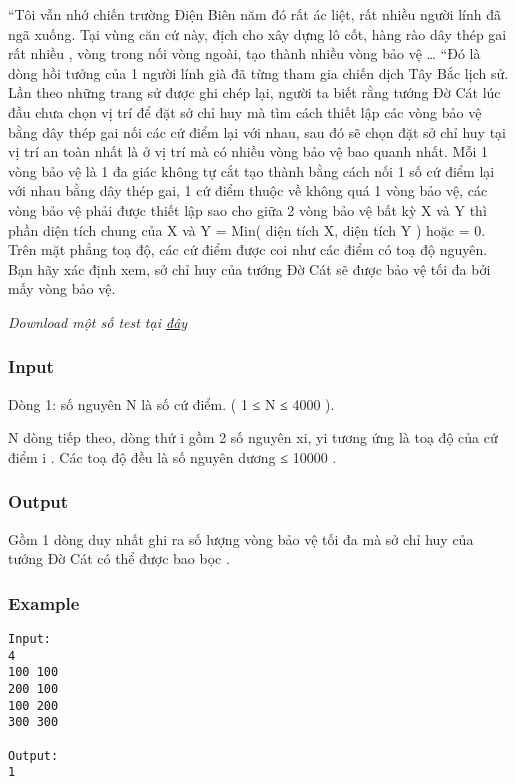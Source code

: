 



   “Tôi vẫn nhớ chiến trường Điện Biên năm đó rất ác liệt, rất nhiều người lính đã ngã xuống. Tại vùng căn cứ này, địch cho xây dựng lô cốt, hàng rào dây thép gai rất nhiều , vòng trong nối vòng ngoài, tạo thành nhiều vòng bảo vệ … “Đó là dòng hồi tưởng của 1 người lính già đã từng tham gia chiến dịch Tây Bắc lịch sử. Lần theo những trang sử được ghi chép lại, người ta biết rằng tướng Đờ Cát lúc đầu chưa chọn vị trí để đặt sở chỉ huy mà tìm cách thiết lập các vòng bảo vệ bằng dây thép gai nối các cứ điểm lại với nhau, sau đó sẽ chọn đặt sở chỉ huy tại vị trí an toàn nhất là ở vị trí mà có nhiều vòng bảo vệ bao quanh nhất. Mỗi 1 vòng bảo vệ là 1 đa giác không tự cắt tạo thành bằng cách nối 1 số cứ điểm lại với nhau bằng dây thép gai, 1 cứ điểm thuộc về không quá 1 vòng bảo vệ, các vòng bảo vệ phải được thiết lập sao cho giữa 2 vòng bảo vệ bất kỳ X và Y thì phần diện tích chung của X và Y = Min( diện tích X, diện tích Y ) hoặc = 0. Trên mặt phẳng toạ độ, các cứ điểm được coi như các điểm có toạ độ nguyên. Bạn hãy xác định xem, sở chỉ huy của tướng Đờ Cát sẽ được bảo vệ tối đa bởi mấy vòng bảo vệ.   





\textit{    Download một số test tại    \href{http://vn.spoj.pl/content/MILITARY.rar}{     đây    }}

\subsubsection{   Input  }

   Dòng 1: số nguyên N là số cứ điểm. ( 1 ≤ N ≤ 4000 ).   


   N dòng tiếp theo, dòng thứ i gồm 2 số nguyên xi, yi tương ứng là toạ độ của cứ điểm i . Các toạ độ đều là số nguyên dương ≤ 10000 .  

\subsubsection{   Output  }

   Gồm 1 dòng duy nhất ghi ra số lượng vòng bảo vệ tối đa mà sở chỉ huy của tướng Đờ Cát có thể được bao bọc .  

\subsubsection{   Example  }
\begin{verbatim}
Input:
4
100 100
200 100
100 200
300 300

Output:
1
\end{verbatim}
